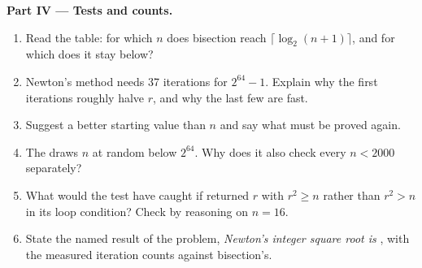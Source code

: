 \begin{problem}
\medskip\noindent\textbf{Part IV --- Tests and counts.}
\begin{enumerate}[resume]
\item Read the table: for which $n$ does bisection reach $\lceil \log_2 (n + 1) \rceil$, and for which does it stay
below?
\item Newton's method needs 37 iterations for $2^{64} - 1$. Explain why the first iterations roughly halve $r$, and
why the last few are fast.
\item Suggest a better starting value than $n$ and say what must be proved again.
\item The  draws $n$ at random below $2^{64}$. Why does it also check every $n < 2000$ separately?
\item What would the test have caught if  returned $r$ with $r^2 \geq n$ rather than $r^2 > n$ in its
loop condition? Check by reasoning on $n = 16$.
\item State the named result of the problem, \emph{Newton's integer square root is }, with the measured
iteration counts against bisection's.
\end{enumerate}
\end{problem}
